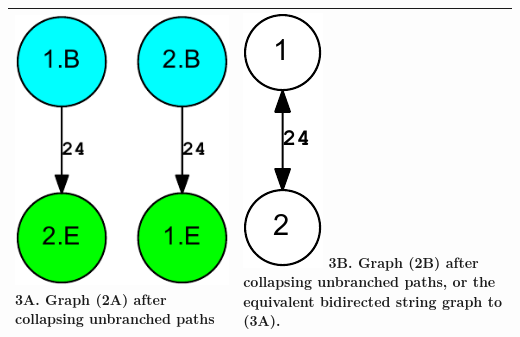 \documentclass[letterpaper,12pt]{article}
\begin{document}
\begin{tabular}{|p{}|p{}|}
\\ \hline

\includegraphics[scale=0.6]{out.reduced.collapsed.digraph-crop.pdf}
\newline 3A. Graph (2A) after collapsing unbranched paths
&
\includegraphics[scale=0.6]{out.reduced.collapsed.bidigraph-crop.pdf}
\newline 3B. Graph (2B) after collapsing unbranched paths, or the equivalent
bidirected string graph to (3A).

\\ \hline

\end{tabular}
\newpage

\end{document}
